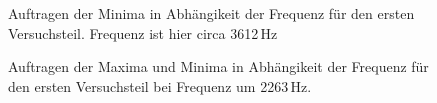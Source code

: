 \documentclass[11pt,a4paper]{article}
\begin{document}
\begin{figure}[p]
\centering
{}
\renewcommand\thefigure{4}
\caption[Auftragen der Minima in Abh\"angikeit der Frequenz f\"ur den ersten Versuchsteil]{Auftragen der Minima in Abh\"angikeit der Frequenz f\"ur den ersten Versuchsteil. Frequenz ist hier circa 3612\,Hz}
\label{Abb:4}
\end{figure}


\begin{figure}[p]
\centering
{}
\renewcommand\thefigure{5}
\caption[Auftragen der Maxima und Minima in Abh\"angikeit der Frequenz f\"ur den ersten Versuchsteil bei Frequenz um 5036 Hz]{Auftragen der Maxima und Minima in Abh\"angikeit der Frequenz f\"ur den ersten Versuchsteil bei Frequenz um 2263\,Hz.}
\label{Abb:5}
\end{figure}
\end{document}
